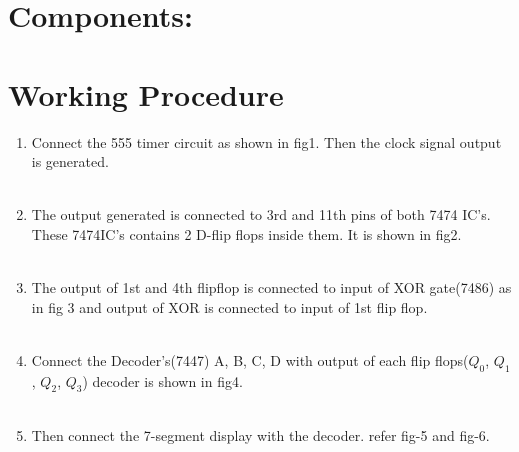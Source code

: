 \documentclass[12pt, journal]{IEEEtran}
\begin{document}
		\maketitle
	\section*{Components:}
	\begin{table}[htbp]
		\label{tab:Hardware_Assignment}
		
	\end{table}
	\section*{Working Procedure}
	\begin{enumerate}
	\item Connect the 555 timer circuit as shown in fig1. Then the clock signal output is generated. \\\\
	\item The output generated is connected to 3rd and 11th pins of both 7474 IC's. These 7474IC's contains 2 D-flip flops inside them. It is shown in fig2. \\\\
	\item The output of 1st and 4th flipflop is connected to input of XOR gate(7486) as in fig 3 and output of XOR is connected to input of 1st flip flop.\\\\
	\item Connect the Decoder's(7447) A, B, C, D with output of each flip flops($Q_0$, $Q_1$, $Q_2$, $Q_3$) decoder is shown in fig4.\\\\
	\item Then connect the 7-segment display with the decoder. refer fig-5 and fig-6.\\\\
	\end{enumerate}
\end{document}
